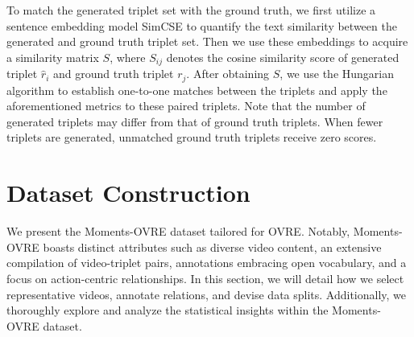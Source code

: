 \documentclass[letterpaper]{article}
\begin{document}
To match the generated triplet set with the ground truth,
we first utilize a sentence embedding model SimCSE \cite{gao2021simcse} to quantify the text similarity between the generated and ground truth triplet set.
Then we use these embeddings to acquire a similarity matrix $S$, where $S_{ij}$ denotes the cosine similarity score of generated triplet $\hat r_i$ and ground truth triplet $r_{j}$.
After obtaining $S$, we use the Hungarian algorithm to establish one-to-one matches between the triplets and apply the aforementioned metrics to these paired triplets.
Note that the number of generated triplets may differ from that of ground truth triplets. When fewer triplets are generated, unmatched ground truth triplets receive zero scores.

\section{Dataset Construction}
We present the Moments-OVRE dataset tailored for OVRE. Notably, Moments-OVRE boasts distinct attributes such as diverse video content, an extensive compilation of video-triplet pairs, annotations embracing open vocabulary, and a focus on action-centric relationships.
In this section, we will detail how we select representative videos, annotate relations, and devise data splits. Additionally, we thoroughly explore and analyze the statistical insights within the Moments-OVRE dataset.
\end{document}
